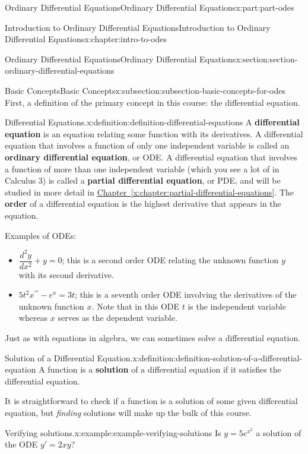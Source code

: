\documentclass[twoside,10pt,]{book}
\newcommand{\xreffont}{\relax}
\newcommand{\terminology}[1]{\textbf{#1}}
\numberwithin{equation}{part}
\providecommand{\dv}[3][]{\dfrac{d^{#1} #2}{d #3^{#1}}}
\begin{document}
\begin{partptx}{Ordinary Differential Equations}{}{Ordinary Differential Equations}{}{}{x:part:part-odes}
\begin{chapterptx}{Introduction to Ordinary Differential Equations}{}{Introduction to Ordinary Differential Equations}{}{}{x:chapter:intro-to-odes}
\begin{sectionptx}{Ordinary Differential Equations}{}{Ordinary Differential Equations}{}{}{x:section:section-ordinary-differential-equations}
\begin{subsectionptx}{Basic Concepts}{}{Basic Concepts}{}{}{x:subsection:subsection-basic-concepts-for-odes}
First, a definition of the primary concept in this course: the differential equation.%
\begin{definition}{Differential Equations.}{x:definition:definition-differential-equations}%
%
A \terminology{differential equation} is an equation relating some function with its derivatives. A differential equation that involves a function of only one independent variable is called an \terminology{ordinary differential equation}, or ODE. A differential equation that involves a function of more than one independent variable (which you see a lot of in Calculus 3) is called a \terminology{partial differential equation}, or PDE, and will be studied in more detail in \hyperref[x:chapter:partial-differential-equations]{Chapter~{\xreffont\ref{x:chapter:partial-differential-equations}}}. The \terminology{order} of a differential equation is the highest derivative that appears in the equation.%
\end{definition}
Examples of ODEs:%
\begin{itemize}[label=\textbullet]
\item{}\(\dv[2]{y}{x} + y = 0\); this is a second order ODE relating the unknown function \(y\) with its second derivative.%
\item{}\(5t^{2}x^{'''} - e^{x} = 3t\); this is a seventh order ODE involving the derivatives of the unknown function \(x\). Note that in this ODE \(t\) is the independent variable whereas \(x\) serves as the dependent variable.%
\end{itemize}
%
\par
Just as with equations in algebra, we can sometimes solve a differential equation.%
\begin{definition}{Solution of a Differential Equation.}{x:definition:definition-solution-of-a-differential-equation}%
%
A function is a \terminology{solution} of a differential equation if it satisfies the differential equation.%
\end{definition}
It is straightforward to check if a function is a solution of some given differential equation, but \emph{finding} solutions will make up the bulk of this course.%
\begin{example}{Verifying solutions.}{x:example:example-verifying-solutions}%
Is \(y = 5e^{x^{2}}\) a solution of the ODE \(y' = 2xy\)?%
\par\smallskip%

\end{example}
\end{subsectionptx}
\end{sectionptx}
\end{chapterptx}
\end{partptx}
\end{document}
